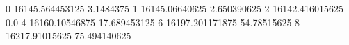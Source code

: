0 16145.564453125 3.1484375
1 16145.06640625 2.650390625
2 16142.416015625 0.0
4 16160.10546875 17.689453125
6 16197.201171875 54.78515625
8 16217.91015625 75.494140625
